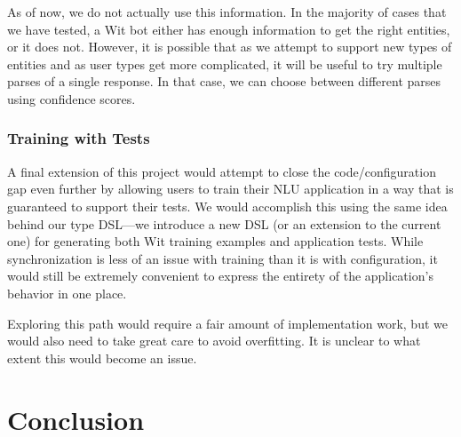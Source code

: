 \documentclass[twocolumn]{article}
\begin{document}
As of now, we do not actually use this information. In the majority of cases
that we have tested, a Wit bot either has enough information to get the right
entities, or it does not. However, it is possible that as we attempt to support
new types of entities and as user types get more complicated, it will be useful
to try multiple parses of a single response. In that case, we can choose between
different parses using confidence scores.

\subsubsection{Training with Tests}
A final extension of this project would attempt to close the code/configuration
gap even further by allowing users to train their NLU application in a way that
is guaranteed to support their tests. We would accomplish this using the same
idea behind our type DSL---we introduce a new DSL (or an extension to the
current one) for generating both Wit training examples and application tests.
While synchronization is less of an issue with training than it is with
configuration, it would still be extremely convenient to express the entirety of
the application's behavior in one place.

Exploring this path would require a fair amount of implementation work, but we
would also need to take great care to avoid overfitting. It is unclear to what
extent this would become an issue.

\section{Conclusion} \label{conclusion}
\end{document}
